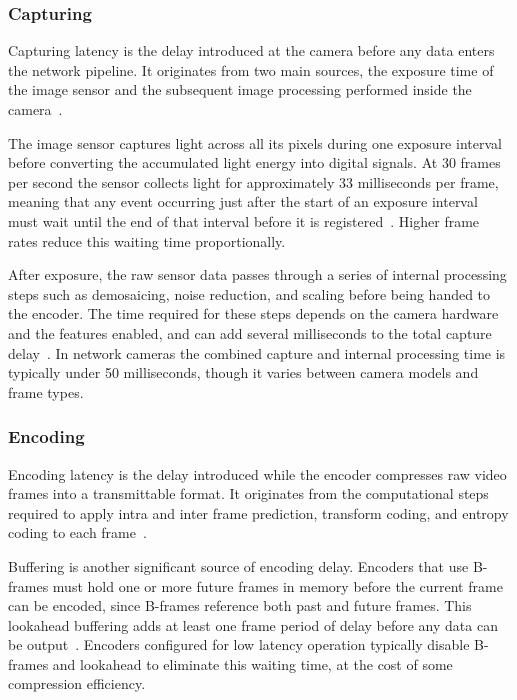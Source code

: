 \subsubsection{Capturing}\label{subsec:capturing}
Capturing latency is the delay introduced at the camera before any data enters the network pipeline. It originates from two main sources, the exposure time of the image sensor and the subsequent image processing performed inside the camera~\cite{axis2024}.
 
The image sensor captures light across all its pixels during one exposure interval before converting the accumulated light energy into digital signals. At 30 frames per second the sensor collects light for approximately 33 milliseconds per frame, meaning that any event occurring just after the start of an exposure interval must wait until the end of that interval before it is registered~\cite{axis2024}. Higher frame rates reduce this waiting time proportionally.
 
After exposure, the raw sensor data passes through a series of internal processing steps such as demosaicing, noise reduction, and scaling before being handed to the encoder. The time required for these steps depends on the camera hardware and the features enabled, and can add several milliseconds to the total capture delay~\cite{axis2024, kaknjo2018}. In network cameras the combined capture and internal processing time is typically under 50 milliseconds, though it varies between camera models and frame types.

\subsubsection{Encoding}\label{subsec:encoding}
Encoding latency is the delay introduced while the encoder compresses raw video frames into a transmittable format. It originates from the computational steps required to apply intra and inter frame prediction, transform coding, and entropy coding to each frame~\cite{axis2024}.
 
Buffering is another significant source of encoding delay. Encoders that use B-frames must hold one or more future frames in memory before the current frame can be encoded, since B-frames reference both past and future frames. This lookahead buffering adds at least one frame period of delay before any data can be output~\cite{hamidouche2022}. Encoders configured for low latency operation typically disable B-frames and lookahead to eliminate this waiting time, at the cost of some compression efficiency.
 
